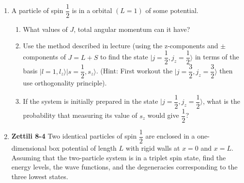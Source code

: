\documentclass[fleqn]{article}
\begin{document}
  \begin{enumerate}
    \item A particle of spin $\dfrac{1}{2}$ is in a orbital $(L=1)$ of some potential.
    \begin{enumerate}
      \item What values of $J$, total angular momentum can it have?


      \item Use the method described in lecture (using the z-components and $\pm$ components of $J=L+S$ to find the state 
      $\vert j=\dfrac{1}{2}, j_z=\dfrac{1}{2} \rangle$ in terms of the basis $\vert l=1,l_z \rangle \vert s=\dfrac{1}{2}, s_z \rangle$.
      (Hint: First workout the $\vert j=\dfrac{3}{2}, j_z=\dfrac{3}{2} \rangle$ then use orthogonality principle).


      \item If the system is initially prepared in the state $\vert j=\dfrac{1}{2}, j_z=\dfrac{1}{2} \rangle$, what is the probability that
      measuring its value of $s_z$ would give $\dfrac{1}{2}$?


    \end{enumerate}

    \item \textbf{Zettili 8-4}
    Two identical particles of spin $\dfrac{1}{2}$ are enclosed in a one-dimensional box potential of length $L$ with rigid walls at 
    $x=0$ and $x=L$. Assuming that the two-particle system is in a triplet spin state, find the energy levels, the wave functions, and the degeneracies corresponding
    to the three lowest states.


\end{enumerate}
\end{document}
